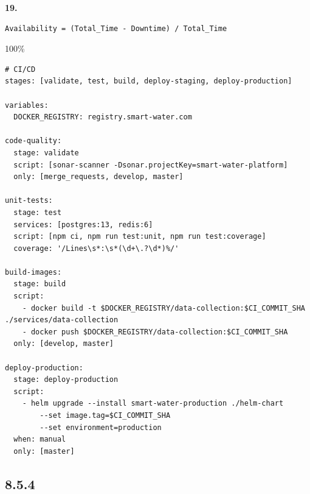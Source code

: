 \textbf{19. }

\begin{verbatim}
Availability = (Total_Time - Downtime) / Total_Time
\end{verbatim}

100\%

\begin{verbatim}
# CI/CD
stages: [validate, test, build, deploy-staging, deploy-production]

variables:
  DOCKER_REGISTRY: registry.smart-water.com

code-quality:
  stage: validate
  script: [sonar-scanner -Dsonar.projectKey=smart-water-platform]
  only: [merge_requests, develop, master]

unit-tests:
  stage: test
  services: [postgres:13, redis:6]
  script: [npm ci, npm run test:unit, npm run test:coverage]
  coverage: '/Lines\s*:\s*(\d+\.?\d*)%/'

build-images:
  stage: build
  script:
    - docker build -t $DOCKER_REGISTRY/data-collection:$CI_COMMIT_SHA ./services/data-collection
    - docker push $DOCKER_REGISTRY/data-collection:$CI_COMMIT_SHA
  only: [develop, master]

deploy-production:
  stage: deploy-production
  script:
    - helm upgrade --install smart-water-production ./helm-chart 
        --set image.tag=$CI_COMMIT_SHA
        --set environment=production
  when: manual
  only: [master]
\end{verbatim}

\subsection{8.5.4}\label{section-69}


